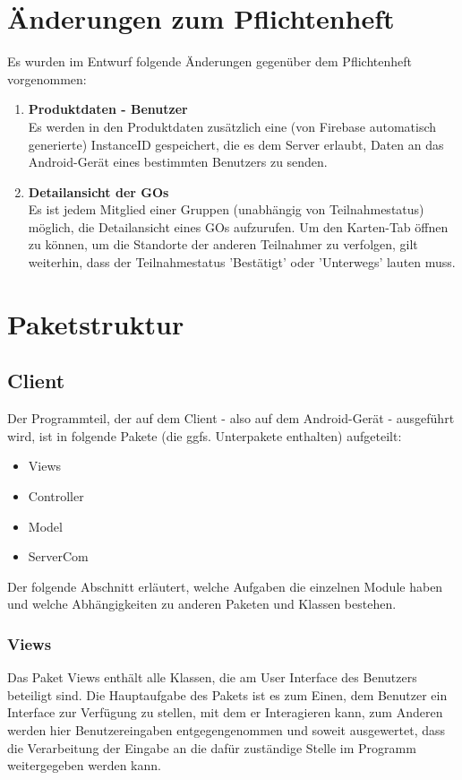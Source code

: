 



\section{Änderungen zum Pflichtenheft}

Es wurden im Entwurf folgende Änderungen gegenüber dem Pflichtenheft vorgenommen:
\begin{enumerate}
	\item \textbf{Produktdaten - Benutzer} \\
	Es werden in den Produktdaten zusätzlich eine (von Firebase automatisch generierte) InstanceID gespeichert, die es dem Server erlaubt, Daten an das Android-Gerät eines bestimmten Benutzers zu senden.
	\item \textbf{Detailansicht der GOs} \\
	Es ist jedem Mitglied einer Gruppen (unabhängig von Teilnahmestatus) möglich, die Detailansicht eines GOs aufzurufen. Um den Karten-Tab öffnen zu können, um die Standorte der anderen Teilnahmer zu verfolgen, gilt weiterhin, dass der Teilnahmestatus 'Bestätigt' oder 'Unterwegs' lauten muss.
\end{enumerate}


\section{Paketstruktur}

\subsection{Client}
Der Programmteil, der auf dem Client - also auf dem Android-Gerät - ausgeführt wird, ist in folgende Pakete (die ggfs. Unterpakete enthalten) aufgeteilt:
\begin{itemize}
	\item Views
	\item Controller
	\item Model
	\item ServerCom
\end{itemize}

Der folgende Abschnitt erläutert, welche Aufgaben die einzelnen Module haben und welche Abhängigkeiten zu anderen Paketen und Klassen bestehen.

\subsubsection{Views}
Das Paket Views enthält alle Klassen, die am User Interface des Benutzers beteiligt sind. Die Hauptaufgabe des Pakets ist es zum Einen, dem Benutzer ein Interface zur Verfügung zu stellen, mit dem er Interagieren kann, zum Anderen werden hier Benutzereingaben entgegengenommen und soweit ausgewertet, dass die Verarbeitung der Eingabe an die dafür zuständige Stelle im Programm weitergegeben werden kann.\\

